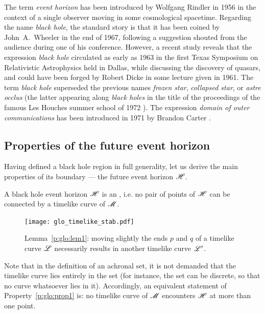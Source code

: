 \begin{hist} \label{h:glo:black_hole_name}
The term \emph{event horizon} has been introduced by Wolfgang Rindler in 1956 \cite{Rindl56}
in the context of a single observer moving in some cosmological spacetime.
Regarding the name \emph{black hole}, the standard
story is that it has been coined by John~A.~Wheeler in the end of 1967,
following a suggestion shouted from the audience during one of his conference.
However, a recent study \cite{HerdeL18} reveals that the expression \emph{black hole}
circulated as early as 1963 in the first Texas Symposium on Relativistic Astrophysics
held in Dallas,
while discussing the discovery of quasars, and could have been forged by
Robert Dicke in some lecture given in 1961.
The term \emph{black hole} superseded the previous names
\emph{frozen star}, \emph{collapsed star}, or \emph{astre occlus}
(the latter appearing along \emph{black holes} in the title of
the proceedings of the famous Les Houches summer school of 1972 \cite{DeWit73}).
The expression \emph{domain of outer communications} has been introduced in 1971 by
Brandon Carter \cite{Carte71}.
\end{hist}


\subsection{Properties of the future event horizon} \label{s:glo:properties_H}

Having defined a black hole region in full generality, let us derive the
main properties of its boundary --- the future event horizon $\mathscr{H}$.


\begin{prop}
\label{p:glo:prop1}
A black hole event horizon $\mathscr{H}$ is an , i.e. no pair of points of $\mathscr{H}$ can be connected
by a timelike curve of $\mathscr{M}$.
\end{prop}

\begin{figure}
\centerline{\texttt{[image: glo\_timelike\_stab.pdf]}}
\caption[]{\label{f:glo:timelike_stab} \footnotesize
Lemma~\ref{p:glo:lem1}: moving slightly the ends $p$ and $q$ of a timelike curve $\mathscr{L}$
necessarily results in another timelike curve $\mathscr{L}'$.}
\end{figure}

Note that in the definition of an achronal set, it is not demanded that the timelike
curve lies entirely in the set (for instance, the set can be discrete, so that no curve
whatsoever lies in it). Accordingly,
an equivalent statement of Property~\ref{p:glo:prop1} is: no timelike curve of $\mathscr{M}$
encounters $\mathscr{H}$ at more than one point.

